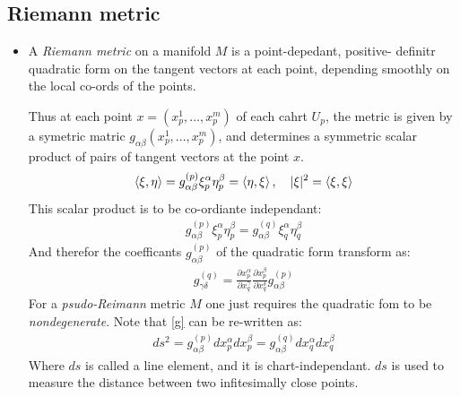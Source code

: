 \documentclass[11pt]{article}
\numberwithin{equation}{section}
\begin{document}
\subsection{Riemann metric}
\begin{itemize}
  \item A \emph{Riemann metric} on a manifold $M$ is a point-depedant, positive- definitr quadratic form on the tangent vectors at each point, depending smoothly on the local co-ords of the points. 

  Thus at each point $x = (x^{1}_{p},\ldots,x^{m}_p)$ of each cahrt $U_{p}$, the metric is given by a symetric matric $g_{\alpha\beta}(x^{1}_{p},...,x^{m}_p)$, and determines a symmetric scalar product of pairs of tangent vectors at the point $x$. 
  \begin{align*}
     \braket{\xi, \eta}  = g_{\alpha\beta}^{(p)}\xi^{\alpha}_{p}\eta^{\beta}_{p} = \braket{\eta,\xi}, ~~~ |\xi|^2 = \braket{\xi,\xi}
   \end{align*} 
   This scalar product is to be co-ordiante independant:
   \begin{align*}
     g_{\alpha\beta}^{(p)}\xi^{\alpha}_{p}\eta^{\beta}_{p} = g_{\alpha\beta}^{(q)}\xi^{\alpha}_{q}\eta^{\beta}_{q}
   \end{align*}
   And therefor the coefficants $g_{\alpha\beta}^{(p)}$ of the quadratic form transform as:
   \begin{align}
   \label{g}
     g_{\gamma\delta}^{(q)}  = \frac{\partial x^{\alpha}_{p}}{\partial x^{\gamma}_{q}}\frac{\partial x^{\beta}_p}{\partial x^{\delta}_{q}}g_{\alpha\beta}^{(p)} 
   \end{align}
   For a \emph{psudo-Reimann} metric $M$ one just requires the quadratic fom to be \emph{nondegenerate}. Note that \ref{g} can be re-written as:
   \begin{align*}
     ds^2 = g_{\alpha\beta}^{(p)}dx^{\alpha}_{p}dx^{\beta}_{p} =g_{\alpha\beta}^{(q)}dx^{\alpha}_{q}dx^{\beta}_{q}  
   \end{align*}
   Where $ds$ is called a line element, and it is chart-independant. $ds$ is used to measure the distance between two infitesimally close points. 
\end{itemize}
\end{document}
